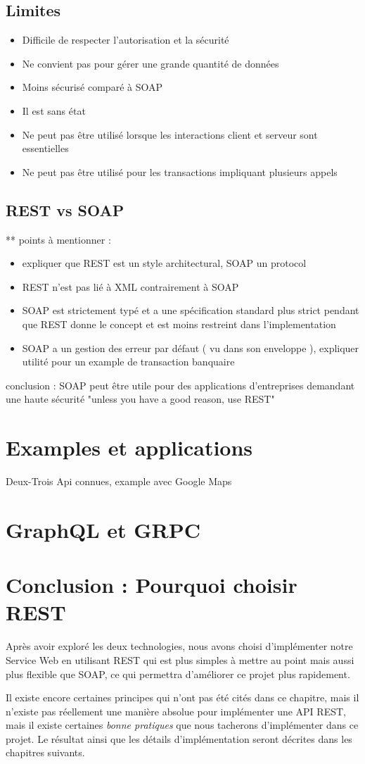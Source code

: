 \subsection{Limites}
\begin{itemize}
	\item Difficile de respecter l'autorisation et la sécurité
	\item Ne convient pas pour gérer une grande quantité de données
	\item Moins sécurisé comparé à SOAP
	\item Il est sans état
	\item Ne peut pas être utilisé lorsque les interactions client et serveur sont essentielles
	\item Ne peut pas être utilisé pour les transactions impliquant plusieurs appels
\end{itemize}
\subsection{REST vs SOAP}
** points à mentionner : 
\begin{itemize}
	\item expliquer que REST est un style architectural, SOAP un protocol
	\item REST n'est pas lié à XML contrairement à SOAP
	\item SOAP est strictement typé et a une spécification standard plus strict pendant que REST donne le concept et est moins restreint dans l'implementation 
	\item SOAP a un gestion des erreur par défaut ( vu dans son enveloppe ), expliquer utilité pour un example de transaction banquaire
\end{itemize}				 
			
conclusion : SOAP peut être utile pour des applications d'entreprises demandant une haute sécurité "unless you have a good reason, use REST" 
\section{Examples et applications}
Deux-Trois Api connues, example avec Google Maps
\section{GraphQL et GRPC}
			
\section{Conclusion : Pourquoi choisir REST}
	Après avoir exploré les deux technologies, nous avons choisi d'implémenter notre Service Web en utilisant REST qui est plus simples à mettre au point mais aussi plus flexible que SOAP, ce qui permettra d'améliorer ce projet plus rapidement.
	
	Il existe encore certaines principes qui n'ont pas été cités dans ce chapitre, mais il n'existe pas réellement une manière absolue pour implémenter une API REST, mais il existe certaines \emph{bonne pratiques} que nous tacherons d'implémenter dans ce projet. Le résultat ainsi que les détails d'implémentation seront décrites dans les chapitres suivants.